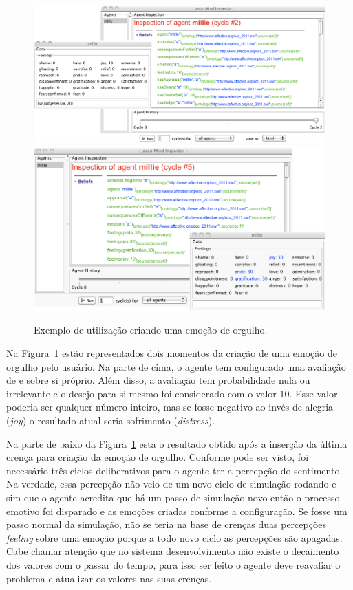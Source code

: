 \begin{figure}
	\begin{center}
		\includegraphics[width=150mm]{figuras/beforeLastInsertionOfPride.png}
		\includegraphics[width=150mm]{figuras/afterLastInsertionOfPride.png}
	\end{center}
	\caption{Exemplo de utilização criando uma emoção de orgulho.}
	\label{fig:testeJasonIntBase}
\end{figure}

Na Figura~\ref{fig:testeJasonIntBase} estão representados dois momentos da
criação de uma emoção de orgulho pelo usuário. Na parte de cima, o
agente tem configurado uma avaliação de e sobre si próprio. Além disso, a
avaliação tem probabilidade nula ou irrelevante e o desejo para si mesmo foi
considerado com o valor 10. Esse valor poderia ser qualquer número inteiro,
mas se fosse negativo ao invés de alegria (\emph{joy}) o resultado atual seria
sofrimento (\emph{distress}).

Na parte de baixo da Figura~\ref{fig:testeJasonIntBase} esta o resultado
obtido após a inserção da última crença para criação da emoção de orgulho.
Conforme pode ser visto,
foi necessário três ciclos deliberativos para o agente ter a percepção do
sentimento. Na verdade, essa percepção não veio de um novo ciclo de simulação
rodando e sim que o agente acredita que há um passo de simulação novo
então o processo emotivo foi disparado e as emoções criadas conforme
a configuração. Se fosse um passo normal da simulação, não se
teria na base de crenças duas percepções \emph{feeling} sobre uma emoção
porque a todo novo ciclo as percepções são apagadas. Cabe chamar atenção que
no sistema desenvolvimento não existe o decaimento dos valores com o
passar do tempo, para isso ser feito o agente deve reavaliar o problema e
atualizar os valores nas suas crenças.

